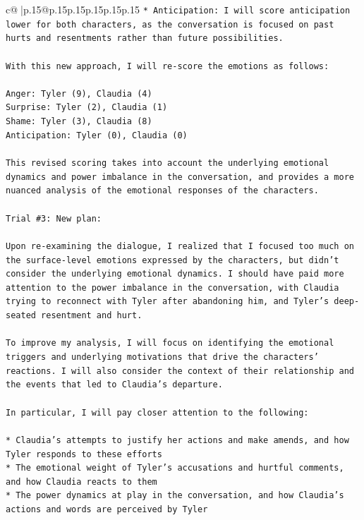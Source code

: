 \documentclass{article}
\begin{document}
{\begin{supertabular}{c@{$\;$}|p{.15\linewidth}@{}p{.15\linewidth}p{.15\linewidth}p{.15\linewidth}p{.15\linewidth}p{.15\linewidth}}
{{{\texttt{* Anticipation: I will score anticipation lower for both characters, as the conversation is focused on past hurts and resentments rather than future possibilities.} \\
\\ 
\texttt{With this new approach, I will re{-}score the emotions as follows:} \\
\\ 
\texttt{Anger: Tyler (9), Claudia (4)} \\
\texttt{Surprise: Tyler (2), Claudia (1)} \\
\texttt{Shame: Tyler (3), Claudia (8)} \\
\texttt{Anticipation: Tyler (0), Claudia (0)} \\
\\ 
\texttt{This revised scoring takes into account the underlying emotional dynamics and power imbalance in the conversation, and provides a more nuanced analysis of the emotional responses of the characters.} \\
\\ 
\texttt{Trial \#3: New plan: } \\
\\ 
\texttt{Upon re{-}examining the dialogue, I realized that I focused too much on the surface{-}level emotions expressed by the characters, but didn't consider the underlying emotional dynamics. I should have paid more attention to the power imbalance in the conversation, with Claudia trying to reconnect with Tyler after abandoning him, and Tyler's deep{-}seated resentment and hurt.} \\
\\ 
\texttt{To improve my analysis, I will focus on identifying the emotional triggers and underlying motivations that drive the characters' reactions. I will also consider the context of their relationship and the events that led to Claudia's departure.} \\
\\ 
\texttt{In particular, I will pay closer attention to the following:} \\
\\ 
\texttt{* Claudia's attempts to justify her actions and make amends, and how Tyler responds to these efforts} \\
\texttt{* The emotional weight of Tyler's accusations and hurtful comments, and how Claudia reacts to them} \\
\texttt{* The power dynamics at play in the conversation, and how Claudia's actions and words are perceived by Tyler} \\
}}}
\end{supertabular}}
\end{document}
